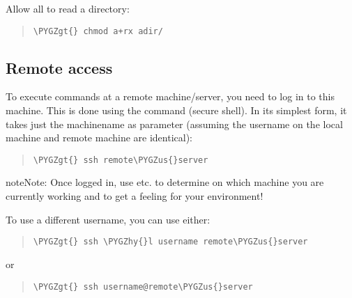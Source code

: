 \documentclass[a4paper,11pt,english]{sphinxmanual}
\def\PYGZus{\char`\_}
\def\PYGZgt{\char`\>}
\def\PYGZhy{\char`\-}
\begin{document}
Allow all to read a directory:
\begin{quote}

\begin{Verbatim}[frame=single, rulecolor=\color{lightgray}, fontfamily=courier, commandchars=\\\{\}]
\PYGZgt{} chmod a+rx adir/
\end{Verbatim}
\end{quote}


\subsection{Remote access}
\label{introduction:remote-access}
To execute commands at a remote machine/server, you need to log in to this machine. This is done
using the  command (secure shell). In its simplest form, it takes just the machinename as
parameter (assuming the username on the local machine and remote machine are identical):
\begin{quote}

\begin{Verbatim}[frame=single, rulecolor=\color{lightgray}, fontfamily=courier, commandchars=\\\{\}]
\PYGZgt{} ssh remote\PYGZus{}server
\end{Verbatim}
\end{quote}

\begin{notice}{note}{Note:}
Once logged in, use   etc. to
determine on which machine you are currently working and to get a feeling for your
environment!
\end{notice}

To use a different username, you can use either:
\begin{quote}

\begin{Verbatim}[frame=single, rulecolor=\color{lightgray}, fontfamily=courier, commandchars=\\\{\}]
\PYGZgt{} ssh \PYGZhy{}l username remote\PYGZus{}server
\end{Verbatim}
\end{quote}

or
\begin{quote}

\begin{Verbatim}[frame=single, rulecolor=\color{lightgray}, fontfamily=courier, commandchars=\\\{\}]
\PYGZgt{} ssh username@remote\PYGZus{}server
\end{Verbatim}
\end{quote}
\end{document}
